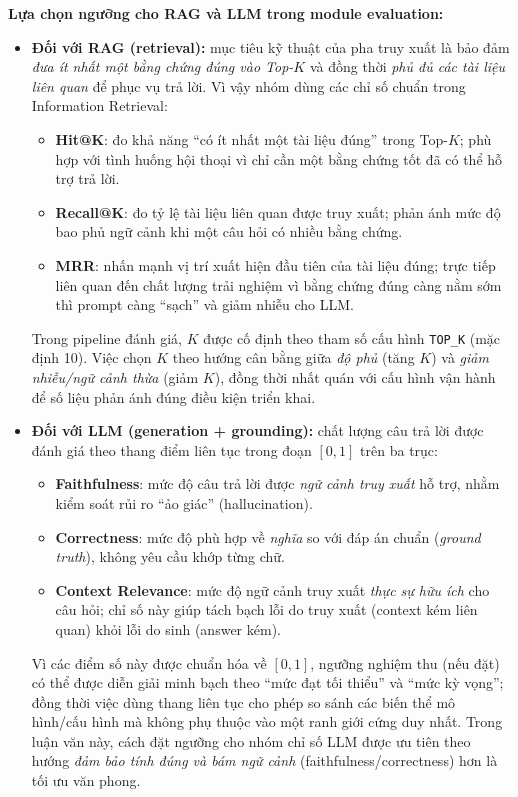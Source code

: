 \noindent\textbf{Lựa chọn ngưỡng cho RAG và LLM trong module evaluation:}
\begin{itemize}
    \item \textbf{Đối với RAG (retrieval):} mục tiêu kỹ thuật của pha truy xuất là bảo đảm \textit{đưa ít nhất một bằng chứng đúng vào Top-$K$} và đồng thời \textit{phủ đủ các tài liệu liên quan} để phục vụ trả lời. Vì vậy nhóm dùng các chỉ số chuẩn trong Information Retrieval:
    \begin{itemize}
        \item \textbf{Hit@K}: đo khả năng ``có ít nhất một tài liệu đúng'' trong Top-$K$; phù hợp với tình huống hội thoại vì chỉ cần một bằng chứng tốt đã có thể hỗ trợ trả lời.
        \item \textbf{Recall@K}: đo tỷ lệ tài liệu liên quan được truy xuất; phản ánh mức độ bao phủ ngữ cảnh khi một câu hỏi có nhiều bằng chứng.
        \item \textbf{MRR}: nhấn mạnh vị trí xuất hiện đầu tiên của tài liệu đúng; trực tiếp liên quan đến chất lượng trải nghiệm vì bằng chứng đúng càng nằm sớm thì prompt càng ``sạch'' và giảm nhiễu cho LLM.
    \end{itemize}
    Trong pipeline đánh giá, $K$ được cố định theo tham số cấu hình \texttt{TOP\_K} (mặc định 10). Việc chọn $K$ theo hướng cân bằng giữa \textit{độ phủ} (tăng $K$) và \textit{giảm nhiễu/ngữ cảnh thừa} (giảm $K$), đồng thời nhất quán với cấu hình vận hành để số liệu phản ánh đúng điều kiện triển khai.

    \item \textbf{Đối với LLM (generation + grounding):} chất lượng câu trả lời được đánh giá theo thang điểm liên tục trong đoạn $[0,1]$ trên ba trục:
    \begin{itemize}
        \item \textbf{Faithfulness}: mức độ câu trả lời được \textit{ngữ cảnh truy xuất} hỗ trợ, nhằm kiểm soát rủi ro ``ảo giác'' (hallucination).
        \item \textbf{Correctness}: mức độ phù hợp về \textit{nghĩa} so với đáp án chuẩn (\textit{ground truth}), không yêu cầu khớp từng chữ.
        \item \textbf{Context Relevance}: mức độ ngữ cảnh truy xuất \textit{thực sự hữu ích} cho câu hỏi; chỉ số này giúp tách bạch lỗi do truy xuất (context kém liên quan) khỏi lỗi do sinh (answer kém).
    \end{itemize}
    Vì các điểm số này được chuẩn hóa về $[0,1]$, ngưỡng nghiệm thu (nếu đặt) có thể được diễn giải minh bạch theo ``mức đạt tối thiểu'' và ``mức kỳ vọng''; đồng thời việc dùng thang liên tục cho phép so sánh các biến thể mô hình/cấu hình mà không phụ thuộc vào một ranh giới cứng duy nhất. Trong luận văn này, cách đặt ngưỡng cho nhóm chỉ số LLM được ưu tiên theo hướng \textit{đảm bảo tính đúng và bám ngữ cảnh} (faithfulness/correctness) hơn là tối ưu văn phong.
\end{itemize}

